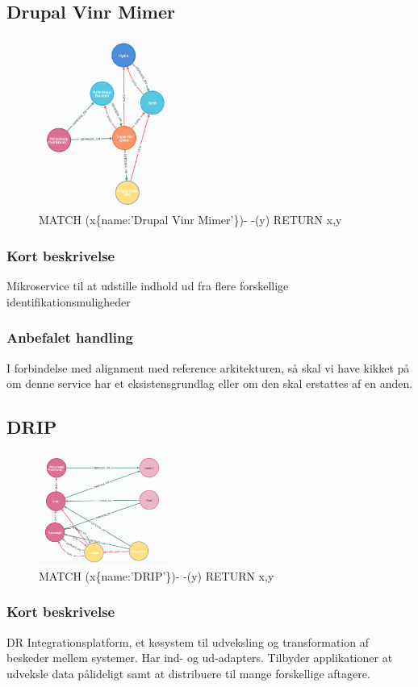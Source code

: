 \documentclass{article}
\begin{document}
\subsection{Drupal Vinr Mimer}
\begin{figure}[h]
\includegraphics[width=120pt]{DrupalVinrMimer.PNG}
\caption{MATCH (x\{name:'Drupal Vinr Mimer'\})- -(y) RETURN x,y}
\end{figure}
\subsubsection{Kort beskrivelse}
Mikroservice til at udstille indhold ud fra flere forskellige identifikationsmuligheder
\subsubsection{Anbefalet handling}
I forbindelse med alignment med reference arkitekturen, så skal vi have kikket på om denne service har et eksistensgrundlag eller om den skal erstattes af en anden.


\subsection{DRIP}
\begin{figure}[h]
\includegraphics[width=120pt]{DRIP.PNG}
\caption{MATCH (x\{name:'DRIP'\})- -(y) RETURN x,y}
\end{figure}
\subsubsection{Kort beskrivelse}
DR Integrationsplatform, et køsystem til udveksling og transformation af beskeder mellem systemer. Har ind- og ud-adapters.
Tilbyder applikationer at udveksle data pålideligt samt at distribuere til mange forskellige aftagere.
\end{document}
